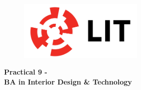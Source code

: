 

\newpage
\setcounter{page}{1}
\begin{center}
	\begin{figure}[ht]
		\centering
		\includegraphics[width = 6cm]{img/LITlogo.jpg}
		\label{fig:logoa9}
	\end{figure}
	\Large\textbf{Practical 9 - }\\
	\large\textbf{BA in Interior Design \& Technology}
\end{center}
		

